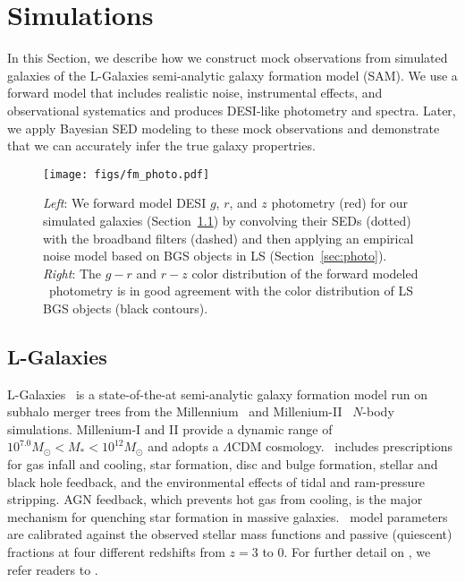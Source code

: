 \section{Simulations}\label{sec:sims}
In this Section, we describe how we construct mock observations from simulated
galaxies of the {\sc L-Galaxies} semi-analytic galaxy formation model (SAM).
We use a forward model that includes realistic noise, instrumental effects, and
observational systematics and produces DESI-like photometry and spectra. 
Later, we apply Bayesian SED modeling to these mock observations and
demonstrate that we can accurately infer the true galaxy propertries.

\begin{figure}
\begin{center}
\texttt{[image: figs/fm\_photo.pdf]}
\caption{{\em Left}: We forward model DESI $g$, $r$, and $z$ photometry (red)
    for our simulated galaxies (Section~\ref{sec:lgal}) by convolving their
    SEDs (dotted) with the broadband filters (dashed) and then applying an 
    empirical noise model based on BGS objects in LS (Section~\ref{sec:photo}).
    {\em Right}: The $g-r$ and $r-z$ color distribution of the forward modeled
    \lgal~photometry is in good agreement with the color distribution of LS BGS
    objects (black contours).} \label{fig:photo}
\end{center}
\end{figure}

\subsection{L-Galaxies} \label{sec:lgal}
{\sc L-Galaxies}~\citep[hereafter \lgal;][]{henriques2015} is a state-of-the-at
semi-analytic galaxy formation model run on subhalo merger trees from the
Millennium~\citep{springel2005a} and Millenium-II~\citep{boylan-kolchin2009}
$N$-body simulations. 
Millenium-I and II provide a dynamic range of $10^{7.0} M_\odot < M_* < 10^{12}
M_\odot$ and adopts a \cite{planckcollaboration2014a} $\Lambda$CDM cosmology.
\lgal~includes prescriptions for gas infall and cooling, star formation, disc
and bulge formation, stellar and black hole feedback, and the environmental
effects of tidal and ram-pressure stripping.
AGN feedback, which prevents hot gas from cooling, is the major mechanism for
quenching star formation in massive galaxies.
\lgal~model parameters are calibrated against the observed stellar mass
functions and passive (quiescent) fractions at four different redshifts from 
$z = 3$ to 0.
For further detail on \lgal, we refer readers to \cite{henriques2015}. 


